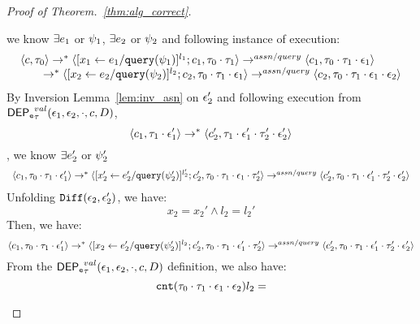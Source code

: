 \begin{proof}[Proof of Theorem.~\ref{thm:alg_correct}]
\begin{case}[$P(\cdot)$]
\[ \]
 we know $\exists e_1$ or $\psi_1$, $\exists e_2$ or $\psi_2$ and following instance of execution:
 \\
\begin{equation}
\label{eq:valdep_inv1}
  \begin{array}{l}   
\langle {c}, \mathtt{\tau}_0 \rangle \rightarrow^{*} 
\langle [\mathrel{ {x}_1 \leftarrow e_1 / {\tt query}(\psi_1) }]^{l_1} ; {c}_1, \mathtt{\tau}_0 \cdot \mathtt{\tau}_1 \rangle  
\rightarrow^{assn/query}
 \langle c_1, \mathtt{\tau}_0 \cdot \mathtt{\tau}_1 \cdot \mathtt{\epsilon}_1 \rangle \\
  \qquad \rightarrow^{*} 
  \langle [\mathrel{ {x}_2 \leftarrow e_2 / {\tt query}(\psi_2) }]^{l_2};{c}_2, 
  \mathtt{\tau}_0 \cdot \mathtt{\tau}_1 \cdot \mathtt{\epsilon}_1 \rangle 
  \rightarrow^{assn/query} 
  \langle {c}_2,  \mathtt{\tau}_0 \cdot \mathtt{\tau}_1 \cdot \mathtt{\epsilon}_1 \cdot \mathtt{\epsilon}_2 \rangle 
\end{array}
\end{equation}
%
%
By Inversion Lemma~\ref{lem:inv_asn} on 
$\mathtt{\epsilon}_2'$ and following execution from $\mathsf{DEP_{\mathtt{e}}}^{val}_{\mathtt{\tau}}(\mathtt{\epsilon}_1, \mathtt{\epsilon}_2, \cdot, c, D)$,
\[
\langle {c}_1, \mathtt{\tau}_1 \cdot \mathtt{\epsilon}_1' \rangle  \rightarrow^{*} 
  \langle {c}_2',  \mathtt{\tau}_1 \cdot \mathtt{\epsilon}_1' \cdot \mathtt{\tau}_2' \cdot \mathtt{\epsilon}_2'  \rangle 
  \], we know $\exists e_2'$ or $\psi_2'$
 \[
  \begin{array}{l}   
  \langle c_1, \mathtt{\tau}_0 \cdot \mathtt{\tau}_1 \cdot \mathtt{\epsilon}_1' \rangle 
  \rightarrow^{*} 
  \langle [\mathrel{ {x}_2' \leftarrow e_2' / {\tt query}(\psi_2') }]^{l_2'} ; {c}_2', \mathtt{\tau}_0 \cdot \mathtt{\tau}_1 \cdot \mathtt{\epsilon}_1 \cdot \mathtt{\tau}_2' \rangle 
  \rightarrow^{assn/query} 
  \langle {c}_2',  \mathtt{\tau}_0 \cdot \mathtt{\tau}_1 \cdot \mathtt{\epsilon}_1' \cdot \mathtt{\tau}_2' \cdot \mathtt{\epsilon}_2' \rangle 
\end{array}
 \]
%
Unfolding $\mathtt{Diff}(\mathtt{\epsilon}_2,\mathtt{\epsilon}_2')$, we have:
\[
  x_2 = x_2' \land l_2 = l_2' 
\] 
%
Then, we have:
\begin{equation}
\label{eq:valdep_inv2}
  \langle c_1, \mathtt{\tau}_0 \cdot \mathtt{\tau}_1 \cdot \mathtt{\epsilon}_1' \rangle 
  \rightarrow^{*} 
  \langle [\mathrel{ {x}_2 \leftarrow e_2' / {\tt query}(\psi_2') }]^{l_2} ; {c}_2', \mathtt{\tau}_0 \cdot \mathtt{\tau}_1 \cdot \mathtt{\epsilon}_1' \cdot \mathtt{\tau}_2' \rangle 
  \rightarrow^{assn/query} 
  \langle {c}_2',  \mathtt{\tau}_0 \cdot \mathtt{\tau}_1 \cdot \mathtt{\epsilon}_1' \cdot \mathtt{\tau}_2' \cdot \mathtt{\epsilon}_2' \rangle 
\end{equation}
%
From the $\mathsf{DEP_{\mathtt{e}}}^{val}_{\mathtt{\tau}}(\mathtt{\epsilon}_1, \mathtt{\epsilon}_2, \cdot, c, D)$ definition, we also have:
\[
  \mathtt{cnt}(\mathtt{\tau}_0 \cdot \mathtt{\tau}_1 \cdot \mathtt{\epsilon}_1 \cdot \mathtt{\epsilon}_2) l_2 = 
\]
\end{case}
\end{proof}
